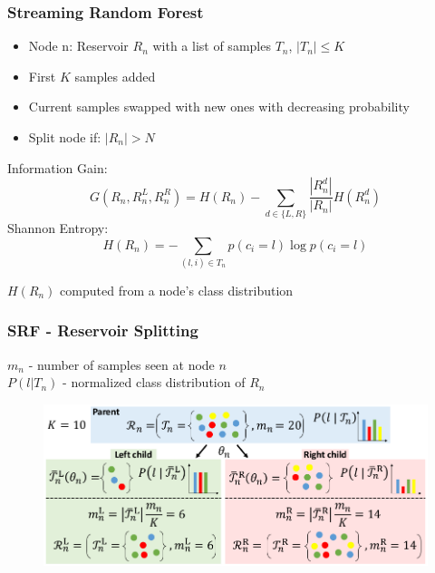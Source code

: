 \documentclass[mathserif, 10pt]{beamer}
\begin{document}
\begin{frame}
\frametitle{Streaming Random Forest}
  \begin{itemize}
   \item Node n: Reservoir $R_n$ with a list of samples $T_n$, $|T_n| \leq K$
   \item First $K$ samples added
   \item Current samples swapped with new ones with decreasing probability
   \item Split node if: $|R_n| > N$
  \end{itemize}

  Information Gain:
  \vspace{-0.25cm}
  \begin{equation} \label{eq:infogain}
    G(R_n, R_n^L, R_n^R) = H(R_n) - \sum_{d \in \{L, R\}} \frac{|R_n^d|}{|R_n|}H(R_n^d)
  \end{equation}
  Shannon Entropy:
  \vspace{-0.25cm}
  \begin{equation}
   H(R_n) = - \sum_{(l, i) \in T_n} p(c_i = l) \log{p(c_i = l)}
  \end{equation}
  
  \vspace{-0.25cm}
  $H(R_n)$ computed from a node's class distribution
\end{frame}

\begin{frame}
\frametitle{SRF - Reservoir Splitting}
$m_n$ - number of samples seen at node $n$\\
$P(l | T_n)$ - normalized class distribution of $R_n$
\vspace{-0.25cm}
\begin{figure}[!ht]
  \center
  \includegraphics[width=\textwidth]{figures/forest}
  \label{fig:forest}
\end{figure}

\end{frame}
\end{document}
